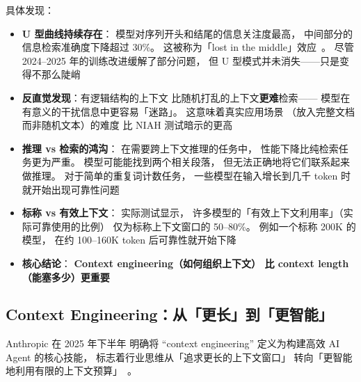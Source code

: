 具体发现：
\begin{itemize}[noitemsep]
  \item \textbf{U 型曲线持续存在}：
        模型对序列开头和结尾的信息关注度最高，
        中间部分的信息检索准确度下降超过 30\%。
        这被称为「lost in the middle」效应~\cite{liu2023lost}。
        尽管 2024--2025 年的训练改进缓解了部分问题，
        但 U 型模式并未消失——只是变得不那么陡峭
  \item \textbf{反直觉发现}：有逻辑结构的上下文
        比随机打乱的上下文\textbf{更难}检索——
        模型在有意义的干扰信息中更容易「迷路」。
        这意味着真实应用场景
        （放入完整文档而非随机文本）的难度
        比 NIAH 测试暗示的更高
  \item \textbf{推理 vs 检索的鸿沟}：
        在需要跨上下文推理的任务中，
        性能下降比纯检索任务更为严重。
        模型可能能找到两个相关段落，
        但无法正确地将它们联系起来做推理。
        对于简单的重复词计数任务，
        一些模型在输入增长到几千 token 时
        就开始出现可靠性问题
  \item \textbf{标称 vs 有效上下文}：
        实际测试显示，
        许多模型的「有效上下文利用率」（实际可靠使用的比例）
        仅为标称上下文窗口的 50--80\%。
        例如一个标称 200K 的模型，
        在约 100--160K token 后可靠性就开始下降
  \item \textbf{核心结论}：
        \textbf{Context engineering（如何组织上下文）
        比 context length（能塞多少）更重要}
\end{itemize}

\subsection{Context Engineering：从「更长」到「更智能」}

Anthropic 在 2025 年下半年
明确将 ``context engineering'' 定义为构建高效 AI Agent 的核心技能，
标志着行业思维从「追求更长的上下文窗口」
转向「更智能地利用有限的上下文预算」~\cite{anthropic2025contexteng}。

